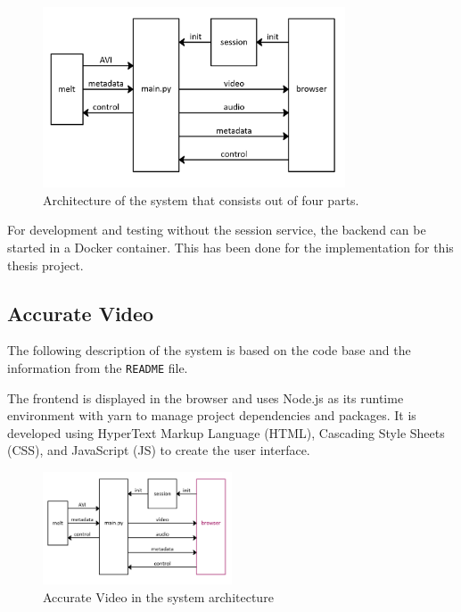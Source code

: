 \documentclass[../MasterThesis.tex]{subfiles}
\begin{document}
\begin{figure}[H]
	\centering
	\includegraphics[width=0.8\textwidth]{IM3.png}
	\caption[Architecture of the system that consists out of four parts.]{Architecture of the system that consists out of four parts.}
	\label{figure:SA}
\end{figure}


For development and testing without the session service, the backend can be started in a Docker container. This has been done for the implementation for this thesis project.







\subsection{Accurate Video} \label{subsection:accuratevideo}

The following description of the system is based on the code base and the information from the \texttt{README} file.~\cite{RM_Frontend}

The frontend is displayed in the browser and uses Node.js as its runtime environment with yarn to manage project dependencies and packages. It is developed using HyperText Markup Language (HTML), Cascading Style Sheets (CSS), and JavaScript (JS) to create the user interface.


\begin{figure}[H]
	\centering
	\includegraphics[width=0.5\textwidth]{IM_FE.png}
	\caption{Accurate Video in the system architecture}
	\label{figure:AS_frontend}
\end{figure}
\end{document}
